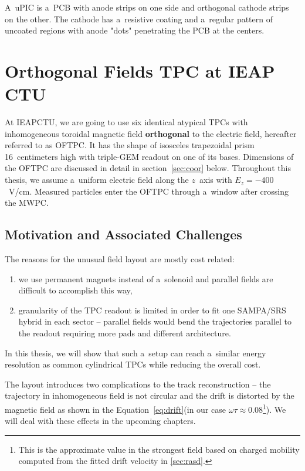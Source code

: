 				A~\ac{uPIC} is a~\ac{PCB} with anode strips on one side and orthogonal cathode strips on the other. The cathode has a~resistive coating and a~regular pattern of uncoated regions with anode "dots" penetrating the \ac{PCB} at the centers.
	
	\section{Orthogonal Fields TPC at IEAP CTU}
	\label{sec:oftpc}
		At \ac{IEAPCTU}, we are going to use six identical atypical \acp{TPC} with inhomogeneous toroidal magnetic field \textbf{orthogonal} to the electric field, hereafter referred to as \acf{OFTPC}. It has the shape of isosceles trapezoidal prism 16~centimeters high with triple\nobreakdash-\ac{GEM} readout on one of its bases. Dimensions of the \ac{OFTPC} are discussed in detail in section~\ref{sec:coor} below. Throughout this thesis, we assume a~uniform electric field along the $z$~axis with $E_z = -400$~V/cm. Measured particles enter the \ac{OFTPC} through a~window after crossing the \ac{MWPC}.
		
		
		\subsection{Motivation and Associated Challenges}
			The reasons for the unusual field layout are mostly cost related:
				\begin{enumerate}[nosep,label=\alph*)]
					\item we use permanent magnets instead of a~solenoid and parallel fields are difficult to accomplish this way,
					\item granularity of the \ac{TPC} readout is limited in order to fit one SAMPA/SRS hybrid in each sector -- parallel fields would bend the trajectories parallel to the readout requiring more pads and different architecture.
				\end{enumerate}
			In this thesis, we will show that such a~setup can reach a~similar energy resolution as common cylindrical \acp{TPC} while reducing the overall cost.
			
			The layout introduces two complications to the track reconstruction -- the trajectory in inhomogeneous field is not circular and the drift is distorted by the magnetic field as shown in the Equation~\ref{eq:drift}(in our case $\omega\tau \approx 0.08$\footnote{This is the approximate value in the strongest field based on charged mobility computed from the fitted drift velocity in \cref{sec:rasd}.}). We will deal with these effects in the upcoming chapters.
			
